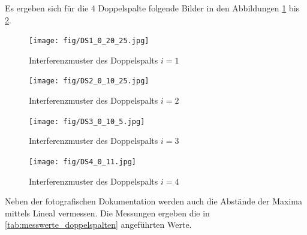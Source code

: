 \documentclass[ngerman]{scrartcl}
\begin{document}
Es ergeben sich für die 4 Doppelspalte folgende Bilder in den Abbildungen \ref{fig:DS_1_interferenzmuster} bis \ref{fig:DS_2_interferenzmuster}. 
\begin{figure}[H]
    \centering
    \begin{samepage}
        \texttt{[image: fig/DS1\_0\_20\_25.jpg]}
        \caption{Interferenzmuster des Doppelspalts $i = 1$}
        \label{fig:DS_1_interferenzmuster}
    \end{samepage}
\end{figure}
\begin{figure}[H]
    \centering
    \begin{samepage}
        \texttt{[image: fig/DS2\_0\_10\_25.jpg]}
        \caption{Interferenzmuster des Doppelspalts $i = 2$}
        \label{fig:DS_2_interferenzmuster}
    \end{samepage}
\end{figure}
\begin{figure}[H]
    \centering
    \begin{samepage}
        \texttt{[image: fig/DS3\_0\_10\_5.jpg]}
        \caption{Interferenzmuster des Doppelspalts $i = 3$}
        \label{fig:DS_3_interferenzmuster}
    \end{samepage}
\end{figure}
\begin{figure}[H]
    \centering
    \begin{samepage}
        \texttt{[image: fig/DS4\_0\_11.jpg]}
        \caption{Interferenzmuster des Doppelspalts $i = 4$}
        \label{fig:DS_4_interferenzmuster}
    \end{samepage}
\end{figure}
Neben der fotografischen Dokumentation werden auch die Abstände der Maxima mittels Lineal vermessen. Die Messungen ergeben die in \autoref{tab:messwerte_doppelspalten} angeführten Werte.
\end{document}
